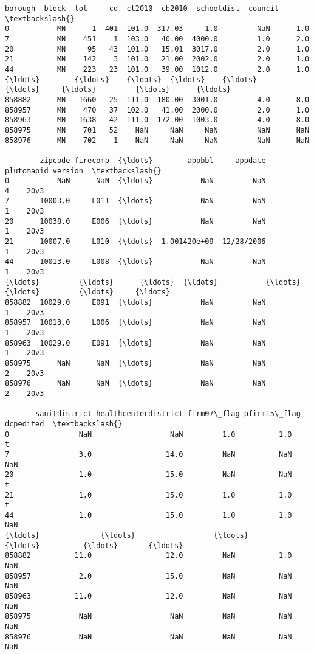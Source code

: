 \documentclass[11pt]{article}
\makeatletter
\newcommand{\boxspacing}{\kern\kvtcb@left@rule\kern\kvtcb@boxsep}
\newcommand{\prompt}[4]{
        {\ttfamily\llap{{\color{#2}[#3]:\hspace{3pt}#4}}\vspace{-\baselineskip}}
    }
\makeatother
\begin{document}
            \begin{tcolorbox}[breakable, size=fbox, boxrule=.5pt, pad at break*=1mm, opacityfill=0]
\prompt{Out}{outcolor}{20}{\boxspacing}
\begin{Verbatim}[commandchars=\\\{\}]
       borough  block  lot     cd  ct2010  cb2010  schooldist  council  \textbackslash{}
0           MN      1  401  101.0  317.03     1.0         NaN      1.0
7           MN    451    1  103.0   40.00  4000.0         1.0      2.0
20          MN     95   43  101.0   15.01  3017.0         2.0      1.0
21          MN    142    3  101.0   21.00  2002.0         2.0      1.0
44          MN    223   23  101.0   39.00  1012.0         2.0      1.0
{\ldots}        {\ldots}    {\ldots}  {\ldots}    {\ldots}     {\ldots}     {\ldots}         {\ldots}      {\ldots}
858882      MN   1660   25  111.0  180.00  3001.0         4.0      8.0
858957      MN    470   37  102.0   41.00  2000.0         2.0      1.0
858963      MN   1638   42  111.0  172.00  1003.0         4.0      8.0
858975      MN    701   52    NaN     NaN     NaN         NaN      NaN
858976      MN    702    1    NaN     NaN     NaN         NaN      NaN

        zipcode firecomp  {\ldots}        appbbl     appdate  plutomapid version  \textbackslash{}
0           NaN      NaN  {\ldots}           NaN         NaN           4    20v3
7       10003.0     L011  {\ldots}           NaN         NaN           1    20v3
20      10038.0     E006  {\ldots}           NaN         NaN           1    20v3
21      10007.0     L010  {\ldots}  1.001420e+09  12/28/2006           1    20v3
44      10013.0     L008  {\ldots}           NaN         NaN           1    20v3
{\ldots}         {\ldots}      {\ldots}  {\ldots}           {\ldots}         {\ldots}         {\ldots}     {\ldots}
858882  10029.0     E091  {\ldots}           NaN         NaN           1    20v3
858957  10013.0     L006  {\ldots}           NaN         NaN           1    20v3
858963  10029.0     E091  {\ldots}           NaN         NaN           1    20v3
858975      NaN      NaN  {\ldots}           NaN         NaN           2    20v3
858976      NaN      NaN  {\ldots}           NaN         NaN           2    20v3

       sanitdistrict healthcenterdistrict firm07\_flag pfirm15\_flag dcpedited  \textbackslash{}
0                NaN                  NaN         1.0          1.0         t
7                3.0                 14.0         NaN          NaN       NaN
20               1.0                 15.0         NaN          NaN         t
21               1.0                 15.0         1.0          1.0         t
44               1.0                 15.0         1.0          1.0       NaN
{\ldots}              {\ldots}                  {\ldots}         {\ldots}          {\ldots}       {\ldots}
858882          11.0                 12.0         NaN          1.0       NaN
858957           2.0                 15.0         NaN          NaN       NaN
858963          11.0                 12.0         NaN          NaN       NaN
858975           NaN                  NaN         NaN          NaN       NaN
858976           NaN                  NaN         NaN          NaN       NaN


\end{Verbatim}
\end{tcolorbox}
\end{document}
